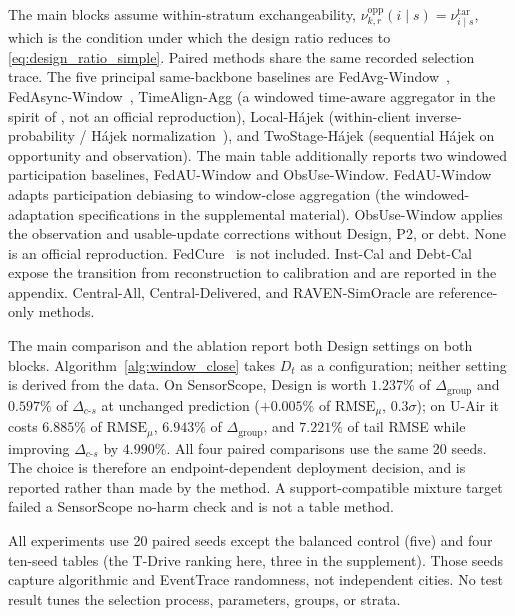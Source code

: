 \documentclass[letterpaper,journal]{IEEEtran}
\begin{document}
The main blocks assume within-stratum exchangeability,
$\nu^{\mathrm{opp}}_{k,r}(i\mid s)=\nu^{\mathrm{tar}}_{i\mid s}$, which is the
condition under which the design ratio reduces to
\eqref{eq:design_ratio_simple}.  Paired methods share the same recorded selection trace.
The five principal same-backbone baselines are
FedAvg-Window~\cite{mcmahan2017communication},
FedAsync-Window~\cite{xie2019asynchronous},
TimeAlign-Agg (a windowed time-aware aggregator in the spirit of
\cite{wang2026federated}, not an official reproduction),
Local-H\'ajek (within-client inverse-probability / H\'ajek
normalization~\cite{horvitz1952generalization,hajek1971comment}), and
TwoStage-H\'ajek (sequential H\'ajek on opportunity and
observation).  The main table additionally
reports two windowed participation baselines, FedAU-Window and
ObsUse-Window.  FedAU-Window adapts participation debiasing
\cite{wang2024lightweight} to window-close aggregation
(the windowed-adaptation specifications in the supplemental material).
ObsUse-Window applies the observation and usable-update
corrections without Design, P2, or debt.  None is an official
reproduction.  FedCure~\cite{chen2026fedcure} is not included.  Inst-Cal and Debt-Cal
expose the transition from reconstruction to calibration and are
reported in the appendix.  Central-All, Central-Delivered, and
RAVEN-SimOracle are reference-only methods.

The main comparison and the ablation report both Design settings on both
blocks.  Algorithm~\ref{alg:window_close} takes $D_t$ as a configuration;
neither setting is derived from the data.  On SensorScope, Design is worth
$1.237\%$ of $\Delta_{\mathrm{group}}$ and $0.597\%$ of
$\Delta_{c\text{-}s}$ at unchanged prediction ($+0.005\%$ of
$\mathrm{RMSE}_{\mu}$, $0.3\sigma$); on U-Air it costs $6.885\%$ of
$\mathrm{RMSE}_{\mu}$, $6.943\%$ of $\Delta_{\mathrm{group}}$, and $7.221\%$
of tail RMSE while improving $\Delta_{c\text{-}s}$ by $4.990\%$.  All four
paired comparisons use the same 20 seeds.  The choice is therefore an
endpoint-dependent deployment decision, and is reported rather than made by
the method.  A support-compatible mixture target failed a
SensorScope no-harm check and is not a table method.

All experiments use 20 paired seeds except the balanced control (five) and four ten-seed tables (the T-Drive
ranking here, three in the supplement).  Those seeds capture algorithmic and EventTrace randomness, not independent
cities.  No test result tunes the selection process, parameters, groups, or strata.
\end{document}
